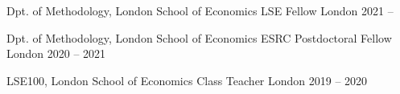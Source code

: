 

\begin{cventries}

  \cventry
    {Dpt. of Methodology, London School of Economics} %
    {LSE Fellow} %
    {London} %
    {2021 --} %
    {
    }

  \cventry
    {Dpt. of Methodology, London School of Economics} %
    {ESRC Postdoctoral Fellow} %
    {London} %
    {2020 -- 2021} %
    {
    }

  \cventry
    {LSE100, London School of Economics} %
    {Class Teacher} %
    {London} %
    {2019 -- 2020} %
    {
    }

\end{cventries}
